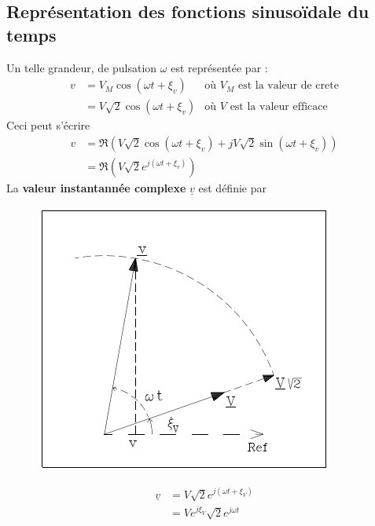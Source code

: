 \subsection{Représentation des fonctions sinusoïdale du temps}
Un telle grandeur, de pulsation $\omega$ est représentée par :
\begin{equation}
	\begin{array}{lll}
		v & = V_M\cos(\omega t + \xi_v)       & \text{où $V_M$ est la valeur de crete} \\
		  & = V\sqrt{2}\cos(\omega t + \xi_v) & \text{où $V$ est la valeur efficace}   
	\end{array}
\end{equation}
Ceci peut s'écrire 
\begin{equation}
	\begin{array}{ll}
		v & = \Re (V\sqrt{2}\cos(\omega t + \xi_v) + jV\sqrt{2}\sin(\omega t + \xi_v)) \\
		  & = \Re (V\sqrt{2}e^{j(\omega t + \xi_v)})                                    
	\end{array}
\end{equation}
La \textbf{valeur instantannée complexe} $\underline{v}$ est définie par \\
\begin{figure}
	\vspace{-15mm}
	\includegraphics[scale=0.4]{ch1/image2.png}
\end{figure}
\begin{equation}
	\begin{array}{ll}
		\underline{v} & = V \sqrt{2}e^{j(\omega t + \xi_V)} \\
		             & = V e^{j\xi_V}\sqrt{2}e^{j\omega t} 
	\end{array}
\end{equation}
